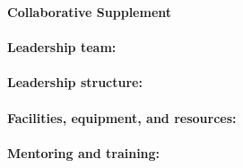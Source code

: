 \newpage

\begin{center}
\textbf{Collaborative Supplement}
\end{center}

\vfill
\paragraph*{Leadership team:}

\vfill
\paragraph*{Leadership structure:}

\vfill
\paragraph*{Facilities, equipment, and resources:}

\vfill
\paragraph*{Mentoring and training:}

\vfill
